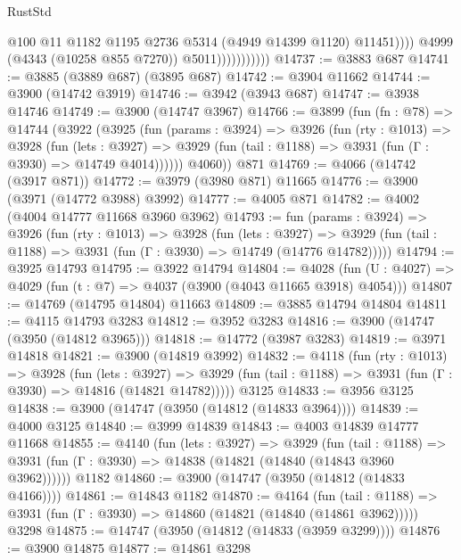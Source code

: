 \begin{lexlean}{RustStd}
\begin{coremodule}
                                  @100
                                  @11
                                  @1182
                                  @1195
                                  @2736
                                  @5314
                                  (@4949 @14399 @1120)
                                  @11451))))
                          @4999
                          (@4343 (@10258 @855 @7270))
                          @5011)))))))))))
@14737 := @3883 @687
@14741 := @3885 (@3889 @687) (@3895 @687)
@14742 := @3904 @11662
@14744 := @3900 (@14742 @3919)
@14746 := @3942 (@3943 @687)
@14747 := @3938 @14746
@14749 := @3900 (@14747 @3967)
@14766 := @3899
    (fun (fn : @78) =>
    @14744
      (@3922
        (@3925
          (fun (params : @3924) =>
          @3926
            (fun (rty : @1013) =>
            @3928
              (fun (lets : @3927) =>
              @3929 (fun (tail : @1188) => @3931 (fun (Γ : @3930) => @14749 @4014))))))
        @4060))
    @871
@14769 := @4066 (@14742 (@3917 @871))
@14772 := @3979 (@3980 @871) @11665
@14776 := @3900 (@3971 (@14772 @3988) @3992)
@14777 := @4005 @871
@14782 := @4002 (@4004 @14777 @11668 @3960 @3962)
@14793 := fun (params : @3924) =>
  @3926
    (fun (rty : @1013) =>
    @3928
      (fun (lets : @3927) =>
      @3929 (fun (tail : @1188) => @3931 (fun (Γ : @3930) => @14749 (@14776 @14782)))))
@14794 := @3925 @14793
@14795 := @3922 @14794
@14804 := @4028
    (fun (U : @4027) => @4029 (fun (t : @7) => @4037 (@3900 (@4043 @11665 @3918) @4054)))
@14807 := @14769 (@14795 @14804) @11663
@14809 := @3885 @14794 @14804
@14811 := @4115 @14793 @3283
@14812 := @3952 @3283
@14816 := @3900 (@14747 (@3950 (@14812 @3965)))
@14818 := @14772 (@3987 @3283)
@14819 := @3971 @14818
@14821 := @3900 (@14819 @3992)
@14832 := @4118
    (fun (rty : @1013) =>
    @3928
      (fun (lets : @3927) =>
      @3929 (fun (tail : @1188) => @3931 (fun (Γ : @3930) => @14816 (@14821 @14782)))))
    @3125
@14833 := @3956 @3125
@14838 := @3900 (@14747 (@3950 (@14812 (@14833 @3964))))
@14839 := @4000 @3125
@14840 := @3999 @14839
@14843 := @4003 @14839 @14777 @11668
@14855 := @4140
    (fun (lets : @3927) =>
    @3929
      (fun (tail : @1188) =>
      @3931 (fun (Γ : @3930) => @14838 (@14821 (@14840 (@14843 @3960 @3962))))))
    @1182
@14860 := @3900 (@14747 (@3950 (@14812 (@14833 @4166))))
@14861 := @14843 @1182
@14870 := @4164
    (fun (tail : @1188) => @3931 (fun (Γ : @3930) => @14860 (@14821 (@14840 (@14861 @3962)))))
    @3298
@14875 := @14747 (@3950 (@14812 (@14833 (@3959 @3299))))
@14876 := @3900 @14875
@14877 := @14861 @3298

\end{coremodule}
\end{lexlean}
